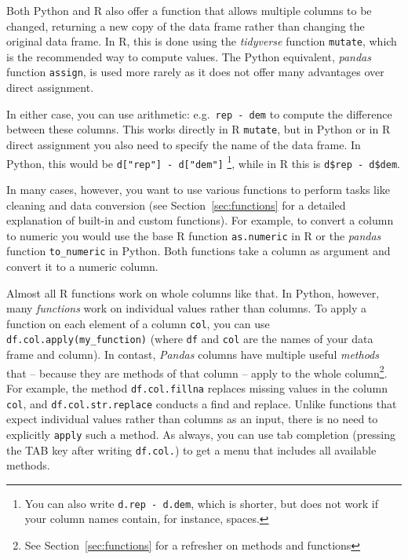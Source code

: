 Both Python and R also offer a function that allows multiple columns to be changed,
returning a new copy of the data frame rather than changing the original data frame.
In R, this is done using the \emph{tidyverse} function \texttt{mutate}, which is the recommended way to compute values.
The Python equivalent, \emph{pandas} function \texttt{assign}, is used more rarely as it does not offer many advantages over direct assignment.

In either case, you can use arithmetic: e.g.\ \verb|rep - dem| to compute the difference between these columns.
This works directly in R \texttt{mutate},
but in Python or in R direct assignment you also need to specify the name of the data frame.
In Python, this would be \verb+d["rep"] - d["dem"]+ \footnote{You can also write \texttt{d.rep - d.dem}, which is shorter, but does not work if your column names contain, for instance, spaces.}, while in R this is \verb+d$rep - d$dem+.

In many cases, however, you want to use various functions to perform tasks like cleaning and data conversion
(see Section~\ref{sec:functions} for a detailed explanation of built-in and custom functions).
For example, to convert a column to numeric you would use the base R function \texttt{as.numeric} in R or the \emph{pandas} function \texttt{to\_numeric} in Python.
Both functions take a column as argument and convert it to a numeric column.

Almost all R functions work on whole columns like that.
In Python, however, many \emph{functions} work on individual values rather than columns.
To apply a function on each element of a column \verb+col+, you can use \verb+df.col.apply(my_function)+
(where \texttt{df} and \texttt{col} are the names of your data frame and column).
In contast, \textit{Pandas} columns have multiple useful \emph{methods} that -- because they are methods
of that column -- apply to the whole column\footnote{See Section~\ref{sec:functions} for a refresher on methods and functions}.
For example, the method \verb+df.col.fillna+ replaces
missing values in the column \verb+col+, and \verb+df.col.str.replace+ conducts a find and replace.
Unlike functions that expect individual values rather than columns as an input, there is no need to explicitly \verb+apply+ such a method.
As always, you can use tab completion (pressing the TAB key after writing \texttt{df.col.}) to get a menu that includes all available methods.

